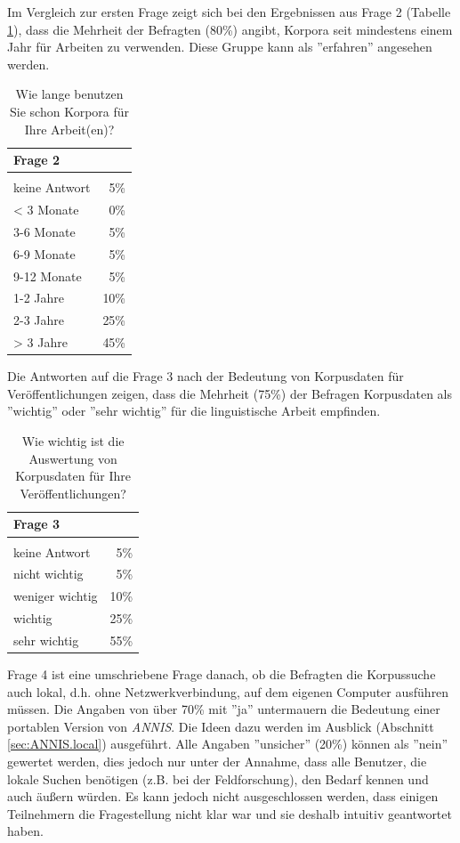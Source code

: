 Im Vergleich zur ersten Frage zeigt sich bei den Ergebnissen aus Frage 2 (Tabelle \ref{tab:Frage2}), dass die Mehrheit der Befragten (80\%) angibt, Korpora seit mindestens  einem Jahr für Arbeiten zu verwenden. Diese Gruppe kann als ''erfahren'' angesehen werden.

	\begin{table}[H]
		\centering
		\begin{tabular}{l | r}
					Frage 2 & \\
					\hline\\
					keine Antwort	& 5\% \\
					<  3 Monate 	& 0\% \\
					3-6 Monate	& 5\% \\
					6-9 Monate 	& 5\% \\
					9-12 Monate	& 5\% \\
					1-2 Jahre		& 10\% \\
					2-3 Jahre		& 25\% \\
					> 3 Jahre		& 45\%
		\end{tabular}
		\caption{Wie lange benutzen Sie schon Korpora für Ihre Arbeit(en)?}\label{tab:Frage2}
	\end{table}

Die Antworten auf die Frage 3 nach der Bedeutung von Korpusdaten für Veröffentlichungen zeigen, dass die Mehrheit (75\%) der Befragen Korpusdaten als ''wichtig'' oder ''sehr wichtig'' für die linguistische Arbeit empfinden.

	\begin{table}[H]
		\centering
		\begin{tabular}{l | r}
					Frage 3 & \\
					\hline\\
					keine Antwort		& 5\% \\
					nicht wichtig 		& 5\% \\
					weniger wichtig	& 10\% \\
					wichtig 			& 25\% \\
					sehr wichtig		& 55\%
		\end{tabular}
		\caption{Wie wichtig ist die Auswertung von Korpusdaten für Ihre Veröffentlichungen?}\label{tab:Frage3}
	\end{table}

Frage 4 ist eine umschriebene Frage danach, ob die Befragten die Korpussuche auch lokal, d.h. ohne Netzwerkverbindung, auf dem eigenen Computer ausführen müssen. Die Angaben von über 70\% mit ''ja'' untermauern die Bedeutung einer portablen Version von \emph{ANNIS}. Die Ideen dazu werden im Ausblick (Abschnitt \ref{sec:ANNIS.local}) ausgeführt. Alle Angaben ''unsicher'' (20\%) können als ''nein'' gewertet werden, dies jedoch nur unter der Annahme, dass alle Benutzer, die lokale Suchen benötigen (z.B. bei der Feldforschung), den Bedarf kennen und auch äußern würden. Es kann jedoch nicht ausgeschlossen werden, dass einigen Teilnehmern die Fragestellung nicht klar war und sie deshalb intuitiv geantwortet haben.


